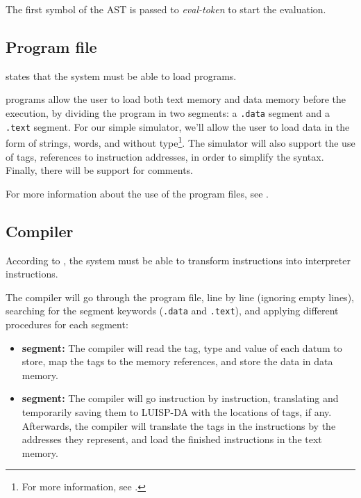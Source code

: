 \noindent
The first symbol of the \gls{AST} is passed to \textit{eval-token} to start the evaluation.


\subsection{Program file}
 states that the system must be able to load  programs.

 programs allow the user to load both \gls{text memory} and \gls{data memory} before the execution, by dividing the program in two segments: a \texttt{.data} segment and a \texttt{.text} segment. For our simple simulator, we'll allow the user to load data in the form of strings, \glspl{word}, and without type\footnote{For more information, see .}. The simulator will also support the use of tags, references to instruction addresses, in order to simplify the  syntax. Finally, there will be support for comments.

\noindent
For more information about the use of the program files, see .


\subsection{Compiler}\label{subsec:compiler-design}
According to , the system must be able to transform  instructions into interpreter instructions.

The compiler will go through the program file, line by line (ignoring empty lines), searching for the segment keywords (\texttt{.data} and \texttt{.text}), and applying different procedures for each segment:
\begin{itemize}
  \item \textbf{ segment:} The compiler will read the tag, type and value of each datum to store, map the tags to the memory references, and store the data in \gls{data memory}.
  \item \textbf{ segment:} The compiler will go instruction by instruction, translating and temporarily saving them to LUISP-DA with the locations of tags, if any. Afterwards, the compiler will translate the tags in the instructions by the addresses they represent, and load the finished instructions in the \gls{text memory}.
\end{itemize}



